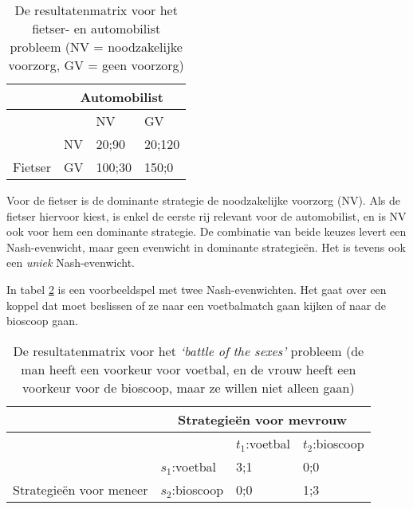 \begin{table}[H]
\small\centering\captionsetup{justification=centering,margin=2cm}
\begin{tabular}{l|lll}
\cline{2-4}
 & \multicolumn{3}{c|}{\cellcolor[HTML]{EFEFEF}Automobilist} \\ \hline
\multicolumn{1}{|l|}{\cellcolor[HTML]{EFEFEF}} &  & NV & GV \\
\multicolumn{1}{|l|}{\cellcolor[HTML]{EFEFEF}} & NV & 20;90 & 20;120 \\
\multicolumn{1}{|l|}{\multirow{-3}{*}{\cellcolor[HTML]{EFEFEF}Fietser}} & GV & 100;30 & 150;0 \\ \cline{1-1}
\end{tabular}
\caption{De resultatenmatrix voor het fietser- en automobilist probleem (NV = noodzakelijke voorzorg, GV = geen voorzorg)}
\label{tab:h3spel3}
\end{table}

Voor de fietser is de dominante strategie de noodzakelijke voorzorg (NV). Als de fietser hiervoor kiest, is enkel de eerste rij relevant voor de automobilist, en is NV ook voor hem een dominante strategie. De combinatie van beide keuzes levert een Nash-evenwicht, maar geen evenwicht in dominante strategie\"en. Het is tevens ook een \textit{uniek} Nash-evenwicht.\\

\par In tabel \ref{tab:h3spel4} is een voorbeeldspel met twee Nash-evenwichten. Het gaat over een koppel dat moet beslissen of ze naar een voetbalmatch gaan kijken of naar de bioscoop gaan.

\begin{table}[H]
\small\centering\captionsetup{justification=centering,margin=2cm}
\begin{tabular}{l|lll}
\cline{2-4}
 & \multicolumn{3}{c|}{\cellcolor[HTML]{EFEFEF}Strategie\"en voor mevrouw} \\ \hline
\multicolumn{1}{|l|}{\cellcolor[HTML]{EFEFEF}} &  & $t_1$:voetbal & $t_2$:bioscoop \\
\multicolumn{1}{|l|}{\cellcolor[HTML]{EFEFEF}} & $s_1$:voetbal & 3;1 & 0;0 \\
\multicolumn{1}{|l|}{\multirow{-3}{*}{\cellcolor[HTML]{EFEFEF}Strategie\"en voor meneer}} & $s_2$:bioscoop & 0;0 & 1;3 \\ \cline{1-1}
\end{tabular}
\caption{De resultatenmatrix voor het \textit{`battle of the sexes'} probleem (de man heeft een voorkeur voor voetbal, en de vrouw heeft een voorkeur voor de bioscoop, maar ze willen niet alleen gaan)}
\label{tab:h3spel4}
\end{table}

